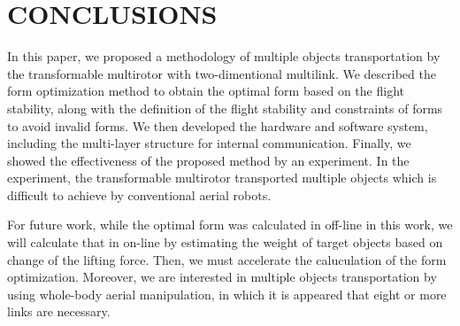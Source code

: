 \section{CONCLUSIONS}
In this paper, we proposed a methodology of multiple objects transportation by the transformable multirotor with two-dimentional multilink. We described the form optimization method to obtain the optimal form based on the flight stability, along with the definition of the flight stability and constraints of forms to avoid invalid forms. We then developed the hardware and software system, including the multi-layer structure for internal communication. Finally, we showed the effectiveness of the proposed method by an experiment. In the experiment, the transformable multirotor transported multiple objects which is difficult to achieve by conventional aerial robots.
\par
For future work, while the optimal form was calculated in off-line in this work, we will calculate that in on-line by estimating the weight of target objects based on change of the lifting force. Then, we must accelerate the caluculation of the form optimization. Moreover, we are interested in multiple objects transportation by using whole-body aerial manipulation\cite{ZhaoICRA2017}, in which it is appeared that eight or more links are necessary.
